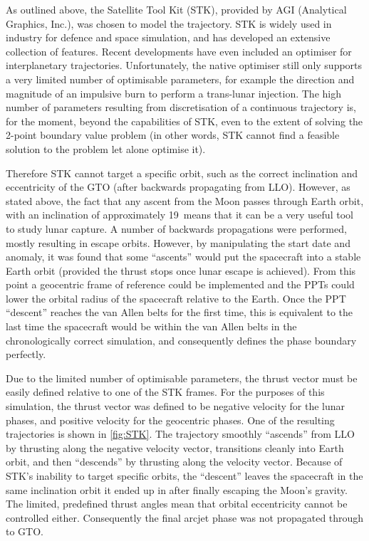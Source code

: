 As outlined above, the Satellite Tool Kit (STK), provided by AGI (Analytical Graphics, Inc.), was chosen to model the trajectory. STK is widely used in industry for defence and space simulation, and has developed an extensive collection of features. Recent developments have even included an optimiser for interplanetary trajectories. Unfortunately, the native optimiser still only supports a very limited number of optimisable parameters, for example the direction and magnitude of an impulsive burn to perform a trans-lunar injection. The high number of parameters resulting from discretisation of a continuous trajectory is, for the moment, beyond the capabilities of STK, even to the extent of solving the 2-point boundary value problem (in other words, STK cannot find a feasible solution to the problem let alone optimise it).

Therefore STK cannot target a specific orbit, such as the correct inclination and eccentricity of the GTO (after backwards propagating from LLO). However, as stated above, the fact that any ascent from the Moon passes through Earth orbit, with an inclination of approximately 19\degrees\ means that it can be a very useful tool to study lunar capture. A number of backwards propagations were performed, mostly resulting in escape orbits. However, by manipulating the start date and anomaly, it was found that some \enquote{ascents} would put the spacecraft into a stable Earth orbit (provided the thrust stops once lunar escape is achieved). From this point a geocentric frame of reference could be implemented and the PPTs could lower the orbital radius of the spacecraft relative to the Earth. Once the PPT \enquote{descent} reaches the van Allen belts for the first time, this is equivalent to the last time the spacecraft would be within the van Allen belts in the chronologically correct simulation, and consequently defines the phase boundary perfectly.

Due to the limited number of optimisable parameters, the thrust vector must be easily defined relative to one of the STK frames. For the purposes of this simulation, the thrust vector was defined to be negative velocity for the lunar phases, and positive velocity for the geocentric phases. One of the resulting trajectories is shown in \autoref{fig:STK}. The trajectory smoothly \enquote{ascends} from LLO by thrusting along the negative velocity vector, transitions cleanly into Earth orbit, and then \enquote{descends} by thrusting along the velocity vector. Because of STK's inability to target specific orbits, the \enquote{descent} leaves the spacecraft in the same inclination orbit it ended up in after finally escaping the Moon's gravity. The limited, predefined thrust angles mean that orbital eccentricity cannot be controlled either. Consequently the final arcjet phase was not propagated through to GTO. 

